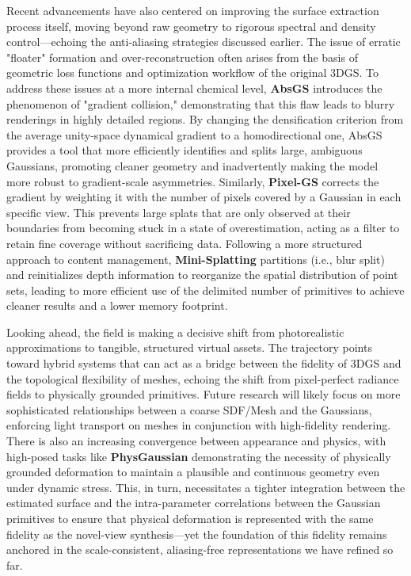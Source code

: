 \documentclass[11pt,a4paper]{article}
\begin{document}
Recent advancements have also centered on improving the surface extraction process itself, moving beyond raw geometry to rigorous spectral and density control---echoing the anti-aliasing strategies discussed earlier. The issue of erratic "floater" formation and over-reconstruction often arises from the basis of geometric loss functions and optimization workflow of the original 3DGS. To address these issues at a more internal chemical level, \textbf{AbsGS} \cite{arxiv:2404.10484v1} introduces the phenomenon of "gradient collision," demonstrating that this flaw leads to blurry renderings in highly detailed regions. By changing the densification criterion from the average unity-space dynamical gradient to a homodirectional one, AbsGS provides a tool that more efficiently identifies and splits large, ambiguous Gaussians, promoting cleaner geometry and inadvertently making the model more robust to gradient-scale asymmetries. Similarly, \textbf{Pixel-GS} \cite{arxiv:2403.15530v1} corrects the gradient by weighting it with the number of pixels covered by a Gaussian in each specific view. This prevents large splats that are only observed at their boundaries from becoming stuck in a state of overestimation, acting as a filter to retain fine coverage without sacrificing data. Following a more structured approach to content management, \textbf{Mini-Splatting} \cite{arxiv:2308.04079v1} partitions (i.e., blur split) and reinitializes depth information to reorganize the spatial distribution of point sets, leading to more efficient use of the delimited number of primitives to achieve cleaner results and a lower memory footprint.

Looking ahead, the field is making a decisive shift from photorealistic approximations to tangible, structured virtual assets. The trajectory points toward hybrid systems that can act as a bridge between the fidelity of 3DGS and the topological flexibility of meshes, echoing the shift from pixel-perfect radiance fields to physically grounded primitives. Future research will likely focus on more sophisticated relationships between a coarse SDF/Mesh and the Gaussians, enforcing light transport on meshes in conjunction with high-fidelity rendering. There is also an increasing convergence between appearance and physics, with high-posed tasks like \textbf{PhysGaussian} \cite{arxiv:2311.12198v3} demonstrating the necessity of physically grounded deformation to maintain a plausible and continuous geometry even under dynamic stress. This, in turn, necessitates a tighter integration between the estimated surface and the intra-parameter correlations between the Gaussian primitives to ensure that physical deformation is represented with the same fidelity as the novel-view synthesis---yet the foundation of this fidelity remains anchored in the scale-consistent, aliasing-free representations we have refined so far.
\end{document}
